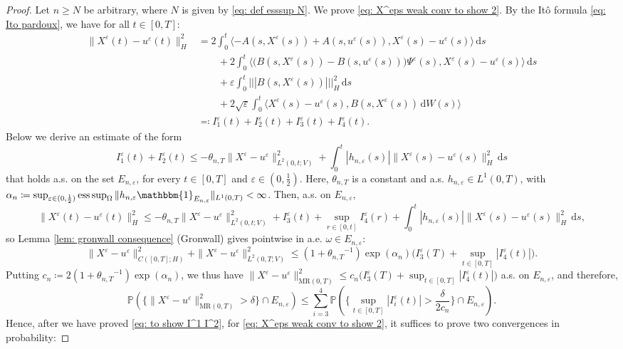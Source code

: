 \documentclass{amsart}
\newcommand{\dd}{\,\mathrm{d}}
\renewcommand{\MR}{\mathrm{MR}}
\newcommand{\one}{\mathbbm{1}}
\newcommand{\<}{\langle}
\newcommand{\?}{\rangle}
\newcommand{\nn}{|\!|\!|}
\DeclareMathOperator*{\esssup}{\textup{ess\,sup}}
\theoremstyle{plain}
\theoremstyle{remark}
\theoremstyle{plain}
\numberwithin{equation}{section}
\renewcommand{\P}{\mathbb{P}}
\newcommand{\Om}{\Omega}
\newcommand{\eps}{\varepsilon}
\begin{document}
\begin{proof}
Let $n\geq N$ be arbitrary, where $N$ is given by \eqref{eq: def esssup N}.
We prove \eqref{eq: X^eps weak conv to show 2}.
By the It\^o formula \eqref{eq: Ito pardoux},
we have for all $t\in[0,T]$:
  \begin{align*}
    \|X^\eps(t)-u^{\eps}(t)\|_H^2
    &=2\int_0^t\<-A(s,X^\eps(s))+A(s,u^{\eps}(s)),X^\eps(s)-u^{\eps}(s)\?\dd s\\
    &\qquad+2\int_0^t\<\big(B(s,X^\eps(s))-B(s,u^{\eps}(s))\big)\Psi^\eps(s),X^\eps(s)-u^{\eps}(s)\?\dd s\\
    &\qquad+\eps\int_0^t \nn B(s,X^\eps(s))\nn_H^2\dd s\\
    &\qquad+2\sqrt{\eps}\int_0^t \<X^\eps(s)-u^{\eps}(s),B(s,X^\eps(s))\dd W(s)\?\\
    &\eqqcolon {I}_1^\eps(t)+{I}_2^\eps(t)+{I}_3^\eps(t)+{I}_4^\eps(t).
    \end{align*}
    Below we derive an estimate of the form
    \begin{equation}\label{eq: to show I^1 I^2}
    {I}_1^\eps(t)+{I}_2^\eps(t)\leq -\theta_{n,T}\|X^\eps-u^{\eps}\|_{L^2(0,t;V)}^2+\int_0^t |h_{n,\eps}(s)|\|X^\eps(s)-u^{\eps}(s)\|_H^2 \dd s
    \end{equation}
    that holds a.s. \!on the set $E_{n,\eps}$, for every $t\in[0,T]$ and $\eps\in(0,\frac{1}{2})$. Here, $\theta_{n,T}$ is a constant and a.s. \!$h_{n,\eps}\in L^1(0,T)$, with $\alpha_n\coloneqq \sup_{\eps\in(0,\frac{1}{2})}\esssup_\Om \|h_{n,\eps}\one_{E_{n,\eps}}\|_{L^1(0,T)}<\infty$.
    Then, a.s. \!on $E_{n,\eps}$,
    \[
    \|X^\eps(t)-u^{\eps}(t)\|_H^2\leq -\theta_{n,T}\|X^\eps-u^{\eps}\|_{L^2(0,t;V)}^2+{I}_3^\eps(t)+\sup_{r\in[0,t]}{I}_4^\eps(r)+\int_0^t |h_{n,\eps}(s)|\|X^\eps(s)-u^{\eps}(s)\|_H^2 \dd s,
    \]
    so Lemma \ref{lem: gronwall consequence} (Gronwall)
    gives pointwise in a.e. $\omega\in E_{n,\eps}$:
    \begin{equation*}
    \|X^\eps-u^{\eps}\|_{C([0,T];H)}^2+\|X^\eps-u^{\eps}\|_{L^2(0,T;V)}^2\leq (1+{\theta_{n,T}}^{-1})\exp(\alpha_n)\Big({I}_3^\eps(T)+\sup_{t\in[0,T]}|{I}_4^\eps(t)|\Big).
    \end{equation*}
Putting $c_{n}\coloneqq 2(1+{\theta_{n,T}}^{-1})\exp({\alpha_n})$, we thus have $\|X^\eps-u^{\eps}\|_{\MR(0,T)}^2\leq c_{n}\Big({I}_3^\eps(T)+\sup_{t\in[0,T]}|{I}_4^\eps(t)|\Big)$ a.s. \!on $E_{n,\eps}$,  and therefore,
    \[
    \P(\{\|X^\eps- u^{\eps}\|_{\MR(0,T)}^2>\delta\}\cap E_{n,\eps})\leq \sum_{i=3}^4\P(\{\sup_{t\in[0,T]}|{I}_i^\eps(t)|>\frac{\delta}{2c_n}\}\cap E_{n,\eps}).
    \]
Hence, after we have proved \eqref{eq: to show I^1 I^2}, for \eqref{eq: X^eps weak conv to show 2}, it suffices to prove two convergences in probability:

\end{proof}
\end{document}
